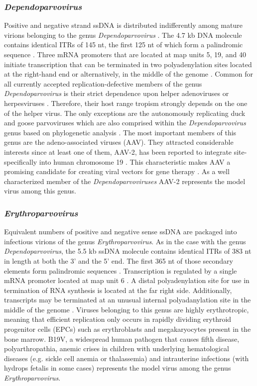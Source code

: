 \subsubsection{\textit{Dependoparvovirus}}
Positive and negative strand ssDNA is distributed indifferently among mature virions belonging to the genus \textit{Dependoparvovirus} \cite{pmid5014934, pmid5264145}. The 4.7 kb DNA molecule contains identical ITRs of 145 nt, the first 125 nt of which form a palindromic sequence \cite{pmid6246271}. Three mRNA promoters that are located at map units 5, 19, and 40 initiate transcription that can be terminated in two polyadenylation sites located at the right-hand end or alternatively, in the middle of the genome \cite{pmid6253077, pmid6281463}. Common for all currently accepted replication-defective members of the genus \textit{Dependoparvovirus} is their strict dependence upon helper adenoviruses or herpesviruses \cite{pmid4318977, pmid6270377, pmid5227666}. Therefore, their host range tropism strongly depends on the one of the helper virus. 
The only exceptions are the autonomously replicating duck and goose parvoviruses which are also comprised within the \textit{Dependoparvovirus} genus based on phylogenetic analysis \cite{icvt}. The most important members of this genus are the adeno-associated viruses (AAV). They attracted considerable interests since at least one of them, AAV-2, has been reported to integrate site-specifically into human chromosome 19 \cite{pmid2156265, pmid1653762, pmid1334463, pmid1657596}. This characteristic makes AAV a promising candidate for creating viral vectors for gene therapy \cite{pmid18854481, pmid21499295}. As a well characterized member of the \textit{Dependoparvoviruses} AAV-2 represents the model virus among this genus.  


\subsubsection{\textit{Erythroparvovirus}}
Equivalent numbers of positive and negative sense ssDNA are packaged into infectious virions of the genus \textit{Erythroparvovirus}. As in the case with the genus \textit{Dependoparvovirus}, the 5.5 kb ssDNA molecule contains identical ITRs of 383 nt in length at both the 3’ and the 5’ end. The first 365 nt of those secondary elements form palindromic sequences \cite{pmid2408228}. Transcription is regulated by a single mRNA promoter located at map unit 6 \cite{pmid3824910}. A distal polyadenylation site for use in termination of RNA synthesis is located at the far right side. Additionally, transcripts may be terminated at an unusual internal polyadanylation site in the middle of the genome \cite{pmid3599180}. Viruses belonging to this genus are highly erythrotropic, meaning that efficient replication only occurs in rapidly dividing erythroid progenitor cells (EPCs) such as erythroblasts and megakaryocytes present in the bone marrow.
B19V, a widespread human pathogen that causes fifth disease, polyarthropathia, anemic crises in children with underlying hematological diseases (e.g. sickle cell anemia or thalassemia) and intrauterine infections (with hydrops fetalis in some cases) \cite{pmid12097253} represents the model virus among the genus \textit{Erythroparvovirus}. 

